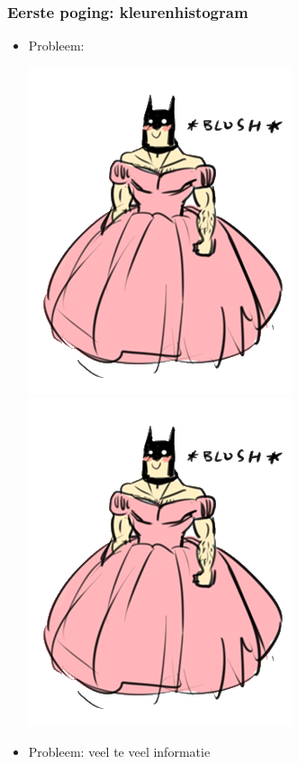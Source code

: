 \documentclass{beamer}
\begin{document}
\begin{frame}
  \frametitle{Eerste poging: kleurenhistogram}

  \begin{itemize}
    \pause \item Probleem:

    \begin{center}
      \includegraphics[scale=.1]{../images/59.png} 
      \hspace{.2in}
      \includegraphics[scale=.2]{../images/59.png}
    \end{center}

    \pause \item Probleem: veel te veel informatie

    \pause


\end{itemize}
\end{frame}
\end{document}
